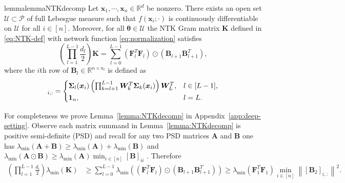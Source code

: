 \documentclass{article}
\theoremstyle{definition}
\newcommand*{\R}{\mathbb{R}}
\newcommand{\mc}{\mathcal}
\def\vx{{\bm{x}}}
\def\mA{{\bm{A}}}
\def\mB{{\bm{B}}}
\def\mF{{\bm{F}}}
\def\mK{{\bm{K}}}
\def\mW{{\bm{W}}}
\def\mSigma{{\bm{\Sigma}}}
\begin{document}
\begin{restatable}{lemma}{lemmaNTKdecomp}\label{lemma:NTKdecomp}
     Let $\vx_1, \cdots, \vx_n \in \R^d$ be nonzero. 
     There exists an open set $\mc{U} \subset \mc{P}$ of full Lebesgue measure such that $f(\vx_i;\cdot)$ is continuously differentiable on $\mc{U}$ for all $i \in [n]$. Moreover, for all $\bm{\theta} \in \mc{U}$ the NTK Gram matrix $\mK$ defined in \eqref{eq:NTK-def} with network function \eqref{eq:normalization} satisfies 
    \[
    \left( \prod_{l = 1}^{L - 1} \frac{d_l}{2}\right)\mK
    {=} \sum_{l = 0}^{L-1} (\mF_{l}^T \mF_{l}) \odot (\mB_{l+1} \mB_{l+1}^T),
    \]
    where the $i$th row of $\mB_l \in \R^{n \times n_l}$     is defined as
    \begin{align*}
        [\mB_l]_{i,:} = \begin{cases}
            \mSigma_l(\vx_i) \left( \prod_{k = l+1}^{L-1} \mW_k^T \mSigma_k(\vx_i) \right)\mW_L^T, &l \in [L-1],\\
            \normalfont{\textbf{1}}_{n}, &l = L.
        \end{cases}
    \end{align*} 
\end{restatable}
For completeness we prove Lemma~\ref{lemma:NTKdecomp} in Appendix~\ref{app:deep-setting}. 
Observe each matrix summand in Lemma~\ref{lemma:NTKdecomp} is positive semi-definite (PSD) and recall for any two PSD matrices $\mA$ and $\mB$ one has $\lambda_{\min}(\mA + \mB) \geq \lambda_{\min}(\mA) + \lambda_{\min}(\mB)$ \citep[see e.g.][Theorem 4.3.1]{Horn_Johnson_2012} and $\lambda_{\min}(\mA \odot \mB) \geq \lambda_{\min}(\mA) \min_{i \in[n]} [\mB]_{ii}$ \citep{Schur1911}. Therefore 
\begin{align*} \label{eq:breakdown-deep-to-shallow}
     \left( \prod_{l = 1}^{L - 1} \frac{d_l}{2}\right)\lambda_{\min}(\mK) & \geq \sum_{l = 0}^{L-1} \lambda_{\min} \left( (\mF_{l}^T \mF_{l}) \odot (\mB_{l+1} \mB_{l+1}^T)\right)    \geq \lambda_{\min}\left( \mF_{1}^T \mF_{1} \right) \min_{i \in [n]} \left\|[\mB_2]_{i,:} \right\|^2.
\end{align*}
\end{document}
